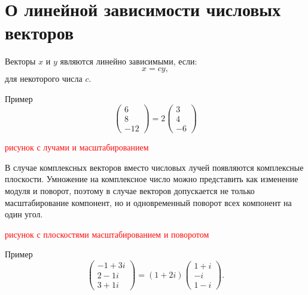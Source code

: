 \section{О линейной зависимости числовых векторов}

Векторы $x$ и $y$ являются линейно зависимыми, если:
\[
    x = c y,
\]
для некоторого числа $c$.

Пример
\[
    \begin{pmatrix}
        6 \\
        8 \\
        - 12
    \end{pmatrix}
    = 2
    \begin{pmatrix}
        3 \\
        4 \\
        -6
    \end{pmatrix}
\]

\textcolor{red}{рисунок с лучами и масштабированием}

В случае комплексных векторов вместо числовых лучей появляются комплексные плоскости. Умножение на комплексное число можно представить как изменение модуля и
поворот, поэтому в случае векторов допускается не только масштабирование компонент, но и одновременный поворот всех компонент на один угол.

\textcolor{red}{рисунок с плоскостями масштабированием и поворотом}

Пример
\[
    \begin{pmatrix}
        -1 + 3i \\
        2 - 1i  \\
        3 + 1i
    \end{pmatrix}
    =
    (1 + 2i)
    \begin{pmatrix}
        1 + i \\
        -i    \\
        1 - i
    \end{pmatrix}
    .
\]
